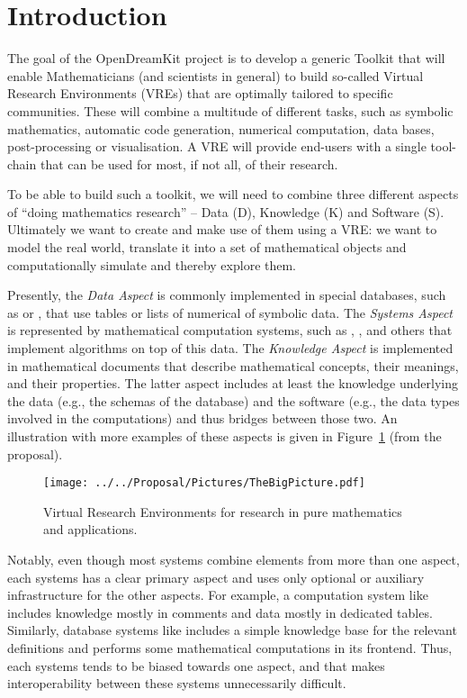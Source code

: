 \section{Introduction}\label{sec:intro}

The goal of the OpenDreamKit project \cite{ODKproposal:on} is to develop a generic Toolkit
that will enable Mathematicians (and scientists in general) to build so-called Virtual
Research Environments (VREs) that are optimally tailored to specific communities. These
will combine a multitude of different tasks, such as symbolic mathematics, automatic code
generation, numerical computation, data bases, post-processing or visualisation. A VRE
will provide end-users with a single tool-chain that can be used for most, if not all, of
their research.

To be able to build such a toolkit, we will need to combine three different aspects of
``doing mathematics research'' -- Data (D), Knowledge (K) and Software (S). Ultimately we want to
create and make use of them using a VRE: we want to model the real world, translate it
into a set of mathematical objects and computationally simulate and thereby explore them. 

Presently, the \emph{Data Aspect} is commonly implemented in special databases, such as \LMFDB or \OEIS, that use tables or lists of
numerical of symbolic data. The \emph{Systems Aspect} is represented by mathematical
computation systems, such as \GAP, \SageMath, and others that implement algorithms on top of this data. The
\emph{Knowledge Aspect} is implemented in mathematical documents that describe mathematical concepts, their meanings, and their properties.
The latter aspect includes at least the knowledge underlying the data (e.g., the schemas of the database) and the software (e.g., the data types involved in the computations) and thus bridges between those two. An
illustration with more examples of these aspects is given in
Figure~\ref{fig:thebigpicture} (from the \pn proposal).

\begin{figure}[ht]\centering
  \texttt{[image: ../../Proposal/Pictures/TheBigPicture.pdf]}
  \caption{Virtual Research Environments for research in pure
    mathematics and applications.}
  \label{fig:thebigpicture}
\end{figure}

Notably, even though most systems combine elements from more than one aspect, each systems has a clear primary aspect and uses only optional or auxiliary infrastructure for the other aspects.
For example, a computation system like \SageMath includes knowledge mostly in comments and data mostly in dedicated tables.
Similarly, database systems like \LMFDB includes a simple knowledge base for the relevant definitions and performs some mathematical computations in its frontend.
Thus, each systems tends to be biased towards one aspect, and that makes interoperability between these systems unnecessarily difficult.


